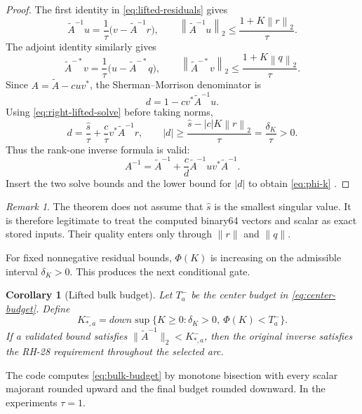 \documentclass[11pt]{article}
\newtheorem{corollary}[theorem]{Corollary}
\theoremstyle{definition}
\theoremstyle{remark}
\newtheorem{remark}[theorem]{Remark}
\newcommand{\norm}[1]{\left\lVert#1\right\rVert}
\newcommand{\Atilde}{\widetilde A}
\begin{document}
\begin{proof}
The first identity in \cref{eq:lifted-residuals} gives
\begin{equation}
 \Atilde^{-1}u=\frac{1}{\tau}
 \bigl(v-\Atilde^{-1}r\bigr),
 \qquad
 \norm{\Atilde^{-1}u}_2\leq\frac{1+K\norm r_2}{\tau}.
 \label{eq:right-lifted-solve}
\end{equation}
The adjoint identity similarly gives
\begin{equation}
 \Atilde^{-*}v=\frac{1}{\tau}
 \bigl(u-\Atilde^{-*}q\bigr),
 \qquad
 \norm{\Atilde^{-*}v}_2\leq\frac{1+K\norm q_2}{\tau}.
 \label{eq:left-lifted-solve}
\end{equation}
Since $A=\Atilde-cuv^*$, the Sherman--Morrison denominator is
\[
 d=1-cv^*\Atilde^{-1}u.
\]
Using \cref{eq:right-lifted-solve} before taking norms,
\[
 d=\frac{\widehat s}{\tau}
   +\frac{c}{\tau}v^*\Atilde^{-1}r,
 \qquad
 |d|\geq\frac{\widehat s-|c|K\norm r_2}{\tau}
 =\frac{\delta_K}{\tau}>0.
\]
Thus the rank-one inverse formula is valid:
\[
 A^{-1}=\Atilde^{-1}
 +\frac{c}{d}\Atilde^{-1}u v^*\Atilde^{-1}.
\]
Insert the two solve bounds and the lower bound for $|d|$ to obtain
\cref{eq:phi-k} \citep{ShermanMorrison1950,SjoestrandZworski2007}.
\end{proof}

\begin{remark}
The theorem does not assume that $\widehat s$ is the smallest singular value.
It is therefore legitimate to treat the computed binary64 vectors and scalar
as exact stored inputs.  Their quality enters only through $\|r\|$ and
$\|q\|$.
\end{remark}

For fixed nonnegative residual bounds, $\Phi(K)$ is increasing on the
admissible interval $\delta_K>0$.  This produces the next conditional gate.

\begin{corollary}[Lifted bulk budget]
\label{cor:bulk-budget}
Let $T_a^-$ be the center budget in \cref{eq:center-budget}.  Define
\begin{equation}
 K_{*,a}^-=down\sup\{K\geq0:
 \delta_K>0,\ \Phi(K)<T_a^-\}.
 \label{eq:bulk-budget}
\end{equation}
If a validated bound satisfies
$\|\Atilde^{-1}\|_2<K_{*,a}^-$, then the original inverse satisfies the
RH-28 requirement throughout the selected arc.
\end{corollary}

The code computes \cref{eq:bulk-budget} by monotone bisection with every
scalar majorant rounded upward and the final budget rounded downward.  In
the experiments $\tau=1$.
\end{document}
